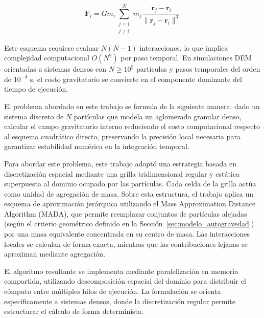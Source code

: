 \documentclass[a4paper,11pt]{book}
\newcommand{\red}[1]{\textcolor{red}{#1}}
\begin{document}
\begin{equation}
	\mathbf{F}_i = G m_i \sum_{\substack{j=1 \\ j \neq i}}^{N}
	m_j \frac{\mathbf{r}_j - \mathbf{r}_i}{\|\mathbf{r}_j - \mathbf{r}_i\|^3}
	\label{eq:fuerza_gravitatoria_directa}
\end{equation}


Este esquema requiere evaluar $N(N-1)$ interacciones, lo que implica complejidad computacional $O(N^2)$ por paso temporal. En simulaciones DEM orientadas a sistemas densos con $N \geq 10^5$ partículas y pasos temporales del orden de $10^{-4}$ s, el costo gravitatorio se convierte en el componente dominante del tiempo de ejecución.

El problema abordado en este trabajo se formula de la siguiente manera: dado un sistema discreto de $N$ partículas que modela un aglomerado granular denso, calcular el campo gravitatorio interno reduciendo el costo computacional respecto al esquema cuadrático directo, preservando la precisión local necesaria para garantizar estabilidad numérica en la integración temporal.

Para abordar este problema, este trabajo adoptó una estrategia basada en discretización espacial mediante una grilla tridimensional regular y estática superpuesta al dominio ocupado por las partículas. Cada celda de la grilla actúa como unidad de agregación de masa. Sobre esta estructura, el trabajo aplica un esquema de aproximación jerárquica utilizando el Mass Approximation Distance Algorithm (MADA), que permite reemplazar conjuntos de partículas alejadas (según el criterio geométrico definido en la Sección~\ref{sec:modelo_autogravedad}) por una masa equivalente concentrada en su centro de masa. Las interacciones locales se calculan de forma exacta, mientras que las contribuciones lejanas se aproximan mediante agregación.

El algoritmo resultante se implementa mediante paralelización en memoria compartida, utilizando descomposición espacial del dominio para distribuir el cómputo entre múltiples hilos de ejecución. La formulación se orienta específicamente a sistemas densos, donde la discretización regular permite estructurar el cálculo de forma determinista.
\end{document}
